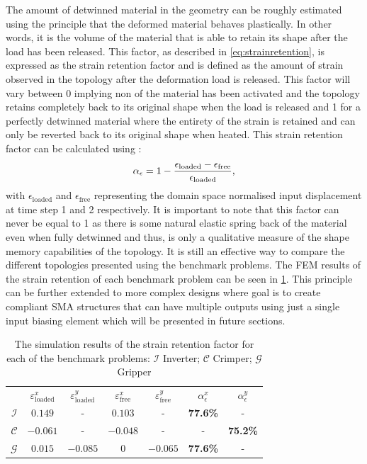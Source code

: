 The amount of detwinned material in the geometry can be roughly estimated using the principle that the deformed material behaves plastically. In other words, it is the volume of the material that is able to retain its shape after the load has been released. This factor, as described in \cref{eq:strainretention}, is expressed as the strain retention factor and is defined as the amount of strain observed in the topology after the deformation load is released. This factor will vary between 0 implying non of the material has been activated and the topology retains completely back to its original shape when the load is released and 1 for a perfectly detwinned material where the entirety of the strain is retained and can only be reverted back to its original shape when heated. This strain retention factor can be calculated using :
\begin{equation}
    \alpha_\epsilon = 1-\frac{\epsilon_\text{loaded}-\epsilon_\text{free}}{\epsilon_\text{loaded}},
    \label{eq:strainretention}
\end{equation}
with $\epsilon_\text{loaded}$ and $\epsilon_\text{free}$ representing the domain space normalised input displacement at time step 1 and 2 respectively. It is important to note that this factor can never be equal to 1 as there is some natural elastic spring back of the material even when fully detwinned and thus, is only a qualitative measure of the shape memory capabilities of the topology. It is still an effective way to compare the different topologies presented using the benchmark problems. The FEM results of the strain retention of each benchmark problem can be seen in \cref{tab:bm-fem-results}. This principle can be further extended to more complex designs where goal is to create compliant SMA structures that can have multiple outputs using just a single input biasing element which will be presented in future sections.
\begin{table}[hbt!]
    \centering
    \caption[The simulation results of the strain retention factor for each of the benchmark problems]{The simulation results of the strain retention factor for each of the benchmark problems: $\boldsymbol{\mathcal{I}}$ Inverter; $\boldsymbol{\mathcal{C}}$ Crimper; $\boldsymbol{\mathcal{G}}$ Gripper}
    \label{tab:bm-fem-results}
    {
     \begin{tabular}{r c c c c c c}
     \rowcolor{black} & \textbf{\color{white} $\varepsilon_\text{loaded}^x$}  & \textbf{\color{white} $\varepsilon_\text{loaded}^y$}  & \textbf{\color{white} $\varepsilon_\text{free}^x$} & \textbf{\color{white} $\varepsilon_\text{free}^y$}  & \textbf{\color{white} $\alpha_\epsilon^x$}  & \textbf{\color{white} $\alpha_\epsilon^y$} \\
     $\boldsymbol{\mathcal{I}}$ & $0.149$ & - & $0.103$ & - & \textbf{77.6\%} & - \\
     $\boldsymbol{\mathcal{C}}$ & $-0.061$ & - & $-0.048$ & - & - & \textbf{75.2\%} \\
     $\boldsymbol{\mathcal{G}}$ & $0.015$ & $-0.085$ & $0$ & $-0.065$ & \textbf{77.6\%} & - \\
 \end{tabular}}
\end{table}
